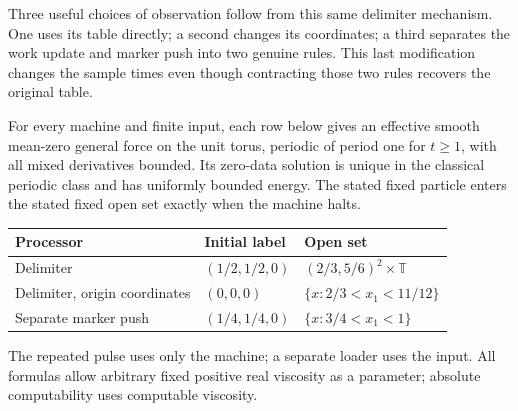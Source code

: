 Three useful choices of observation follow from this same delimiter
mechanism.  One uses its table directly; a second changes its coordinates;
a third separates the work update and marker push into two genuine rules.
This last modification changes the sample times even though contracting
those two rules recovers the original table.

\begin{theorem}
\label{thm:sa-delimiter}\label{thm:sa-delimiter-origin}
\label{thm:sa-left-stack-plane}
For every machine and finite input, each row below gives an effective
smooth mean-zero general force on the unit torus, periodic of period one
for $t\ge1$, with all mixed derivatives bounded.  Its zero-data solution
is unique in the classical periodic class and has uniformly bounded
energy.  The stated fixed particle enters the stated fixed open set
exactly when the machine halts.
\begin{center}\small
\begin{tabular}{lll}
Processor & Initial label & Open set\\\hline
Delimiter & $(1/2,1/2,0)$ & $(2/3,5/6)^2\times\mathbb T$\\
Delimiter, origin coordinates & $(0,0,0)$ & $\{x:2/3<x_1<11/12\}$\\
Separate marker push & $(1/4,1/4,0)$ & $\{x:3/4<x_1<1\}$
\end{tabular}\end{center}
The repeated pulse uses only the machine; a separate loader uses the
input.  All formulas allow arbitrary fixed positive real viscosity as
a parameter; absolute computability uses computable viscosity.
\end{theorem}
